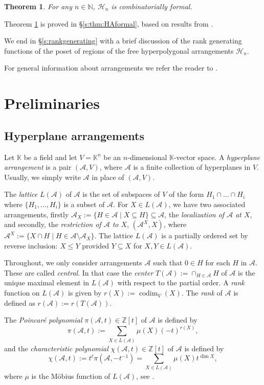 \documentclass[12pt]{amsart}
\newcommand\CA{{\mathscr A}}
\newcommand\CH{{\mathscr H}}
\newcommand\BBK{{\mathbb K}}
\newcommand\BBN{{\mathbb N}}
\newcommand\BBZ{{\mathbb Z}}
\newcommand\codim{\operatorname{codim}}
\numberwithin{equation}{section}
\theoremstyle{plain}
\newtheorem{theorem}[equation]{Theorem}
\theoremstyle{definition}
\begin{document}
\begin{theorem}
	\label{thm:HAformal}
		For any $n \in \BBN$,  $\CH_n$ is combinatorially formal.
\end{theorem}

Theorem \ref{thm:HAformal} is proved in \S \ref{s:thm:HAformal}, based on results from \cite{moellermueckschroehre:formal}.

We end in \S \ref{s:rankgenerating} with a brief discussion of the rank generating functions of the poset of regions of the free hyperpolygonal arrangements  $\CH_n$.

For general information about arrangements
we refer the reader to
\cite{orlikterao:arrangements}.

\section{Preliminaries}
\label{sect:prelims}

\subsection{Hyperplane arrangements}
\label{ssect:arrangements}
Let $\BBK$ be a field and let 
$V = \BBK^n$
be an $n$-dimensional $\BBK$-vector space.
A \emph{hyperplane arrangement} is a pair
$(\CA, V)$, where $\CA$ is a finite collection of hyperplanes in $V$.
Usually, we simply write $\CA$ in place of $(\CA, V)$.

The \emph{lattice} $L(\CA)$ of $\CA$ is the set of subspaces of $V$ of
the form $H_1\cap \ldots \cap H_i$ where $\{ H_1, \ldots, H_i\}$ is a subset
of $\CA$.
For $X \in L(\CA)$, we have two associated arrangements,
firstly
$\CA_X :=\{H \in \CA \mid X \subseteq H\} \subseteq \CA$,
the \emph{localization of $\CA$ at $X$},
and secondly,
the \emph{restriction of $\CA$ to $X$}, $(\CA^X,X)$, where
$\CA^X := \{ X \cap H \mid H \in \CA \setminus \CA_X\}$.
The lattice $L(\CA)$ is a partially ordered set by reverse inclusion:
$X \le Y$ provided $Y \subseteq X$ for $X,Y \in L(\CA)$.

Throughout, we only consider arrangements $\CA$
such that $0 \in H$ for each $H$ in $\CA$.
These are called \emph{central}.
In that case the \emph{center}
$T(\CA) := \cap_{H \in \CA} H$ of $\CA$ is the unique
maximal element in $L(\CA)$  with respect
to the partial order.
A \emph{rank} function on $L(\CA)$
is given by $r(X) := \codim_V(X)$.
The \emph{rank} of $\CA$
is defined as $r(\CA) := r(T(\CA))$.

The \emph{Poincar\'e polynomial} 
$\pi(\CA,t) \in \BBZ[t]$ of $\CA$ is defined by 
\[
\pi(\CA,t) := \sum_{X \in L(\CA)} \mu(X)(-t)^{r(X)},
\]
and the \emph{characteristic polynomial} 
$\chi(\CA,t) \in \BBZ[t]$ 
of $\CA$ is defined by 
\[
\chi(\CA,t) := t^\ell \pi(\CA,-t^{-1}) = \sum_{X \in L(\CA)} \mu(X)t^{\dim X},
\]
where $\mu$ is the M\"obius function of $L(\CA)$, 
see \cite[Def.\ 2.48, Def.\ 2.52]{orlikterao:arrangements}.
\end{document}
